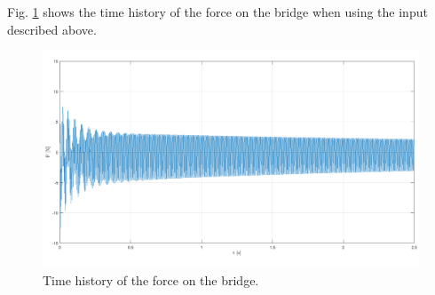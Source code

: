 \documentclass[a4paper]{article}
\begin{document}
Fig. \ref{fig:dleng} shows the time history of the force on the bridge when using the input described above.


\begin{figure}[h]
	\centering
	\includegraphics[width=0.75\linewidth]{time.png}
	\caption{Time history of the force on the bridge.}
	\label{fig:dleng}
\end{figure}


\printbibliography
\end{document}

